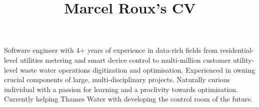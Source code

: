 \documentclass[a4paper,online,extended]{adcv}
\title{Marcel Roux's CV}
\newcommand*{\unistb}{Stellenbosch University}
\begin{document}

Software engineer with 4+ years of experience in data-rich fields from residential-level utilities metering and smart device control to multi-million customer utility-level waste water operations digitization and optimisation. Experienced in owning crucial components of large, multi-disciplinary projects. Naturally curious individual with a passion for learning and a proclivity towards optimisation. Currently helping Thames Water with developing the control room of the future.








\end{document}

